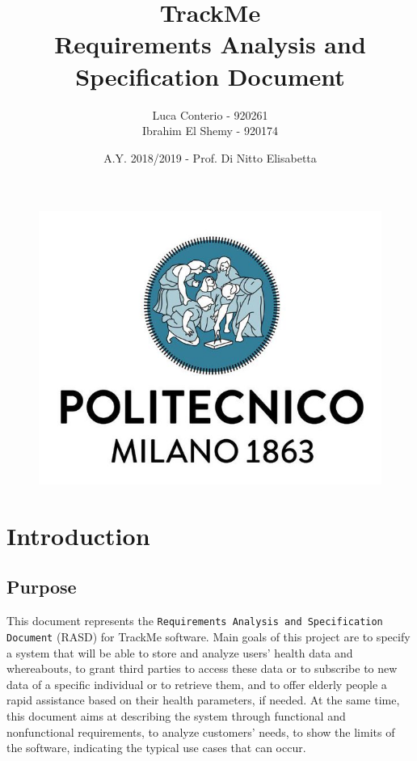 \documentclass[12pt,a4paper]{article}
\author{Luca Conterio - 920261\\
	Ibrahim El Shemy - 920174}
\date{A.Y. 2018/2019 - Prof. Di Nitto Elisabetta}
\title{%
	\textbf{\Huge{TrackMe}} \\
	\large Requirements Analysis and Specification Document
}
\begin{document}
	\begin{figure}
		\centering
		\includegraphics[width=1.0\linewidth]{images/polimi.jpg}
	\end{figure}

	\maketitle

	\newpage
	\tableofcontents
	\newpage

	\section{Introduction}
	\subsection{Purpose}
	This document represents the \texttt{Requirements Analysis and Specification Document} (RASD) for TrackMe software. Main goals of this project are to specify a system that will be able to store and analyze users' health data and whereabouts, to grant third parties to access these data or to subscribe to new data of a specific individual or to retrieve them, and to offer elderly people a rapid assistance based on their health parameters, if needed.
	At the same time, this document aims at describing the system through functional and nonfunctional requirements, to analyze customers' needs, to show the limits of the software, indicating the typical use cases that can occur.
\end{document}
